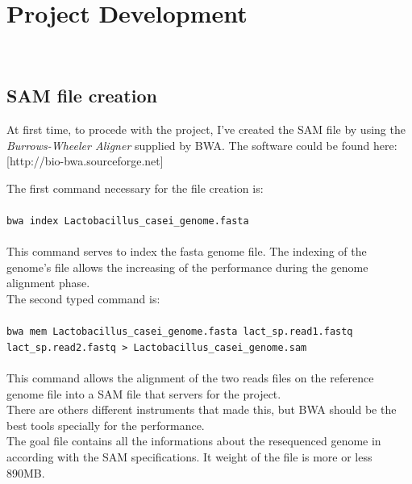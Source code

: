 
\chapter{Project Development}
\label{cap:project-development}

\\

\section{SAM file creation}
At first time, to procede with the project, I've created the SAM file by using the \emph{Burrows-Wheeler Aligner} supplied by BWA.
The software could be found here: \href{http://bio-bwa.sourceforge.net}[http://bio-bwa.sourceforge.net]

The first command necessary for the file creation is:
\\
\\
\verb|bwa index Lactobacillus_casei_genome.fasta|
\\
\\
This command serves to index the fasta genome file. The indexing of the genome's file allows the increasing of the performance during the genome alignment phase.\\

The second typed command is:
\\
\\
\verb|bwa mem Lactobacillus_casei_genome.fasta lact_sp.read1.fastq lact_sp.read2.fastq > Lactobacillus_casei_genome.sam|
\\
\\
This command allows the alignment of the two reads files on the reference genome file into a SAM file that servers for the project.\\

There are others different instruments that made this, but BWA should be the best tools specially for the performance.\\

The goal file contains all the informations about the resequenced genome in according with the SAM specifications.
It weight of the file is more or less 890MB.


